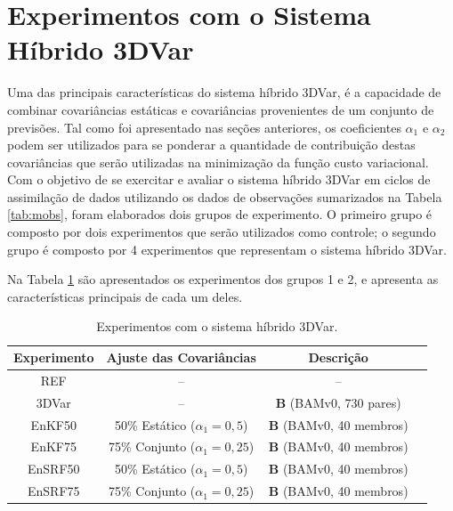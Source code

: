 \section{Experimentos com o Sistema Híbrido 3DVar}
\label{sec:exps}

Uma das principais características do sistema híbrido 3DVar, é a capacidade de combinar covariâncias estáticas e covariâncias provenientes de um conjunto de previsões. Tal como foi apresentado nas seções anteriores, os coeficientes $\alpha_{1}$ e $\alpha_{2}$ podem ser utilizados para se ponderar a quantidade de contribuição destas covariâncias que serão utilizadas na minimização da função custo variacional. Com o objetivo de se exercitar e avaliar o sistema híbrido 3DVar em ciclos de assimilação de dados utilizando os dados de observações sumarizados na Tabela \ref{tab:mobs}, foram elaborados dois grupos de experimento. O primeiro grupo é composto por dois experimentos que serão utilizados como controle; o segundo grupo é composto por 4 experimentos que representam o sistema híbrido 3DVar. 

Na Tabela \ref{tab:exps} são apresentados os experimentos dos grupos 1 e 2, e apresenta as características principais de cada um deles.

\begin{table}[H]
\caption{Experimentos com o sistema híbrido 3DVar.}
\begin{center} 
\begin{tabular}{cccc}
\toprule
\toprule
\multicolumn{1}{c}{\textbf{Experimento}} & \multicolumn{1}{c}{\textbf{Ajuste das Covariâncias}} & \multicolumn{1}{c}{\textbf{Descrição}} \\
\midrule
\multicolumn{1}{c}{REF}     & \multicolumn{1}{c}{--}                 & -- \\
\multicolumn{1}{c}{3DVar}   & \multicolumn{1}{c}{--}                 & \multicolumn{1}{c}{$\mathbf{B}$ (BAMv0, 730 pares)} \\ 
\multicolumn{1}{c}{EnKF50}  & \multicolumn{1}{p{5cm}}{50\% Estático ($\alpha_{1}=0,5$)} & \multicolumn{1}{c}{$\mathbf{B}$ (BAMv0, 40 membros)} \\ 
\multicolumn{1}{c}{EnKF75}  & \multicolumn{1}{p{5cm}}{75\% Conjunto ($\alpha_{1}=0,25$)} & \multicolumn{1}{c}{$\mathbf{B}$ (BAMv0, 40 membros)} \\ 
\multicolumn{1}{c}{EnSRF50} & \multicolumn{1}{p{5cm}}{50\% Estático ($\alpha_{1}=0,5$)} & \multicolumn{1}{c}{$\mathbf{B}$ (BAMv0, 40 membros)} \\ 
\multicolumn{1}{c}{EnSRF75} & \multicolumn{1}{p{5cm}}{75\% Conjunto ($\alpha_{1}=0,25$)} & \multicolumn{1}{c}{$\mathbf{B}$ (BAMv0, 40 membros)} \\ 
\bottomrule
\end{tabular}
\end{center}
\label{tab:exps}
\end{table}

